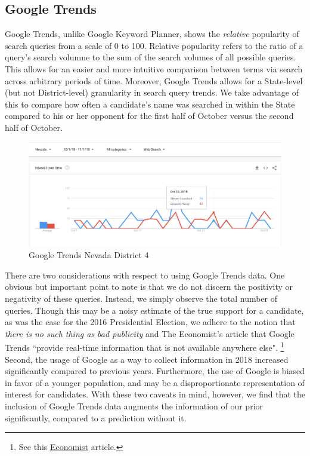 \documentclass[11pt]{article}
\begin{document}
\subsection{Google Trends}
Google Trends, unlike Google Keyword Planner, shows the \textit{relative} popularity of search queries from a scale of 0 to 100. Relative popularity refers to the ratio of a query's search volumne to the sum of the search volumes of all possible queries. This allows for an easier and more intuitive comparison between terms via search across arbitrary periods of time. Moreover, Google Trends allows for a State-level (but not District-level) granularity in search query trends. We take advantage of this to compare how often a candidate's name was searched in within the State compared to his or her opponent for the first half of October versus the second half of October.

 \begin{figure}[tbh]
  \centering
  \includegraphics[scale=0.4]{google_trends_ex}
  \caption{Google Trends Nevada District 4}
  \label{fig:trends}
\end{figure}

There are two considerations with respect to using Google Trends data. One
obvious but important point to note is that we do not discern the positivity or
negativity of these queries. Instead, we simply observe the total number of
queries. Though this may be a noisy estimate of the true support for a
candidate, as was the case for the 2016 Presidential Election, we adhere to the
notion that \textit{there is no such thing as bad publicity} and The Economist's
article that Google Trends ``provide real-time information that is not available
anywhere else". \footnote{See this
\href{https://www.economist.com/graphic-detail/2016/03/01/how-useful-is-google-search-data-when-predicting-primary-elections}{Economist} article.} Second, the usage of Google as a way to collect information in 2018 increased significantly compared to previous years. Furthermore, the use of Google is biased in favor of a younger population, and may be a disproportionate representation of interest for candidates. With these two caveats in mind, however, we find that the inclusion of Google Trends data augments the information of our prior significantly, compared to a prediction without it.
\end{document}
